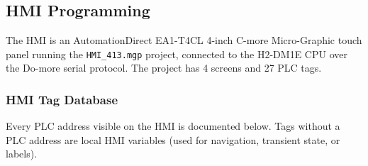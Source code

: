 \documentclass[hidelinks,12pt]{article}
\begin{document}
\subsection{HMI Programming}

The HMI is an AutomationDirect EA1-T4CL 4-inch C-more Micro-Graphic touch panel
running the \texttt{HMI\_413.mgp} project, connected to the H2-DM1E CPU over the
Do-more serial protocol. The project has 4 screens and 27 PLC tags.

\subsubsection{HMI Tag Database}

Every PLC address visible on the HMI is documented below. Tags without a PLC
address are local HMI variables (used for navigation, transient state, or
labels).
\end{document}
